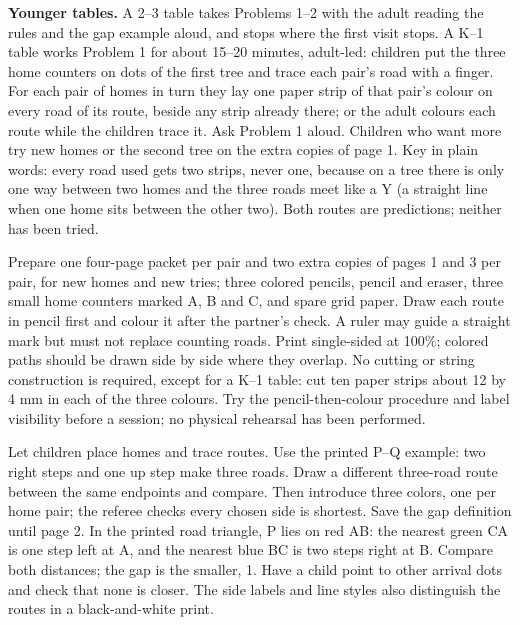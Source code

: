 \documentclass[11pt,letterpaper]{article}
\newcommand{\heading}[1]{\par\vspace{5pt}{\large\bfseries #1}\par}
\begin{document}
\textbf{Younger tables.} A 2--3 table takes Problems 1--2 with the adult reading the rules and the gap example aloud, and stops where the first visit stops. A K--1 table works Problem 1 for about 15--20 minutes, adult-led: children put the three home counters on dots of the first tree and trace each pair's road with a finger. For each pair of homes in turn they lay one paper strip of that pair's colour on every road of its route, beside any strip already there; or the adult colours each route while the children trace it. Ask Problem 1 aloud. Children who want more try new homes or the second tree on the extra copies of page 1. Key in plain words: every road used gets two strips, never one, because on a tree there is only one way between two homes and the three roads meet like a Y (a straight line when one home sits between the other two). Both routes are predictions; neither has been tried.

\heading{Materials and common launch}
Prepare one four-page packet per pair and two extra copies of pages 1 and 3 per pair, for new homes and new tries; three colored pencils, pencil and eraser, three small home counters marked A, B and C, and spare grid paper. Draw each route in pencil first and colour it after the partner's check. A ruler may guide a straight mark but must not replace counting roads. Print single-sided at 100\%; colored paths should be drawn side by side where they overlap. No cutting or string construction is required, except for a K--1 table: cut ten paper strips about 12 by 4 mm in each of the three colours. Try the pencil-then-colour procedure and label visibility before a session; no physical rehearsal has been performed.

Let children place homes and trace routes. Use the printed P--Q example: two right steps and one up step make three roads. Draw a different three-road route between the same endpoints and compare. Then introduce three colors, one per home pair; the referee checks every chosen side is shortest. Save the gap definition until page 2. In the printed road triangle, P lies on red AB: the nearest green CA is one step left at A, and the nearest blue BC is two steps right at B. Compare both distances; the gap is the smaller, 1. Have a child point to other arrival dots and check that none is closer. The side labels and line styles also distinguish the routes in a black-and-white print.
\end{document}

